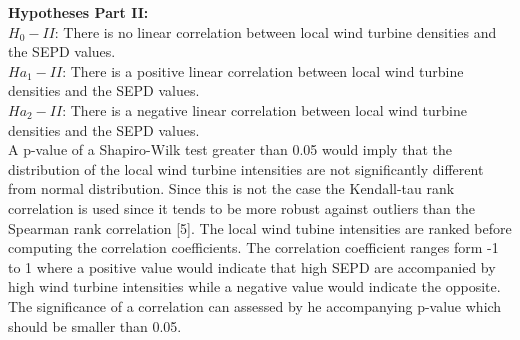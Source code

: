 \documentclass[
]{article}
\begin{document}
\textbf{Hypotheses Part II:}\\
\(H_{0} - II\): There is no linear correlation between local wind
turbine densities and the SEPD values.\\

\(Ha_{1} - II\): There is a positive linear correlation between local
wind turbine densities and the SEPD values.\\

\(Ha_{2} - II\): There is a negative linear correlation between local
wind turbine densities and the SEPD values.\\

A p-value of a Shapiro-Wilk test greater than 0.05 would imply that the
distribution of the local wind turbine intensities are not significantly
different from normal distribution. Since this is not the case the
Kendall-tau rank correlation is used since it tends to be more robust
against outliers than the Spearman rank correlation {[}5{]}. The local
wind tubine intensities are ranked before computing the correlation
coefficients. The correlation coefficient ranges form -1 to 1 where a
positive value would indicate that high SEPD are accompanied by high
wind turbine intensities while a negative value would indicate the
opposite. The significance of a correlation can assessed by he
accompanying p-value which should be smaller than 0.05.
\end{document}
